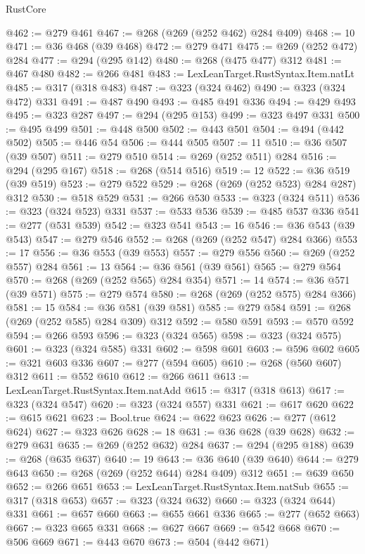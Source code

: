 \begin{lexlean}{RustCore}
\begin{coremodule}
@462 := @279 @461
@467 := @268 (@269 (@252 @462) @284 @409)
@468 := 10
@471 := @36 @468 (@39 @468)
@472 := @279 @471
@475 := @269 (@252 @472) @284
@477 := @294 (@295 @142)
@480 := @268 (@475 @477) @312
@481 := @467 @480
@482 := @266 @481
@483 := LexLeanTarget.RustSyntax.Item.natLt
@485 := @317 (@318 @483)
@487 := @323 (@324 @462)
@490 := @323 (@324 @472) @331
@491 := @487 @490
@493 := @485 @491 @336
@494 := @429 @493
@495 := @323 @287
@497 := @294 (@295 @153)
@499 := @323 @497 @331
@500 := @495 @499
@501 := @448 @500
@502 := @443 @501
@504 := @494 (@442 @502)
@505 := @446 @54
@506 := @444 @505
@507 := 11
@510 := @36 @507 (@39 @507)
@511 := @279 @510
@514 := @269 (@252 @511) @284
@516 := @294 (@295 @167)
@518 := @268 (@514 @516)
@519 := 12
@522 := @36 @519 (@39 @519)
@523 := @279 @522
@529 := @268 (@269 (@252 @523) @284 @287) @312
@530 := @518 @529
@531 := @266 @530
@533 := @323 (@324 @511)
@536 := @323 (@324 @523) @331
@537 := @533 @536
@539 := @485 @537 @336
@541 := @277 (@531 @539)
@542 := @323 @541
@543 := 16
@546 := @36 @543 (@39 @543)
@547 := @279 @546
@552 := @268 (@269 (@252 @547) @284 @366)
@553 := 17
@556 := @36 @553 (@39 @553)
@557 := @279 @556
@560 := @269 (@252 @557) @284
@561 := 13
@564 := @36 @561 (@39 @561)
@565 := @279 @564
@570 := @268 (@269 (@252 @565) @284 @354)
@571 := 14
@574 := @36 @571 (@39 @571)
@575 := @279 @574
@580 := @268 (@269 (@252 @575) @284 @366)
@581 := 15
@584 := @36 @581 (@39 @581)
@585 := @279 @584
@591 := @268 (@269 (@252 @585) @284 @309) @312
@592 := @580 @591
@593 := @570 @592
@594 := @266 @593
@596 := @323 (@324 @565)
@598 := @323 (@324 @575)
@601 := @323 (@324 @585) @331
@602 := @598 @601
@603 := @596 @602
@605 := @321 @603 @336
@607 := @277 (@594 @605)
@610 := @268 (@560 @607) @312
@611 := @552 @610
@612 := @266 @611
@613 := LexLeanTarget.RustSyntax.Item.natAdd
@615 := @317 (@318 @613)
@617 := @323 (@324 @547)
@620 := @323 (@324 @557) @331
@621 := @617 @620
@622 := @615 @621
@623 := Bool.true
@624 := @622 @623
@626 := @277 (@612 @624)
@627 := @323 @626
@628 := 18
@631 := @36 @628 (@39 @628)
@632 := @279 @631
@635 := @269 (@252 @632) @284
@637 := @294 (@295 @188)
@639 := @268 (@635 @637)
@640 := 19
@643 := @36 @640 (@39 @640)
@644 := @279 @643
@650 := @268 (@269 (@252 @644) @284 @409) @312
@651 := @639 @650
@652 := @266 @651
@653 := LexLeanTarget.RustSyntax.Item.natSub
@655 := @317 (@318 @653)
@657 := @323 (@324 @632)
@660 := @323 (@324 @644) @331
@661 := @657 @660
@663 := @655 @661 @336
@665 := @277 (@652 @663)
@667 := @323 @665 @331
@668 := @627 @667
@669 := @542 @668
@670 := @506 @669
@671 := @443 @670
@673 := @504 (@442 @671)

\end{coremodule}
\end{lexlean}
